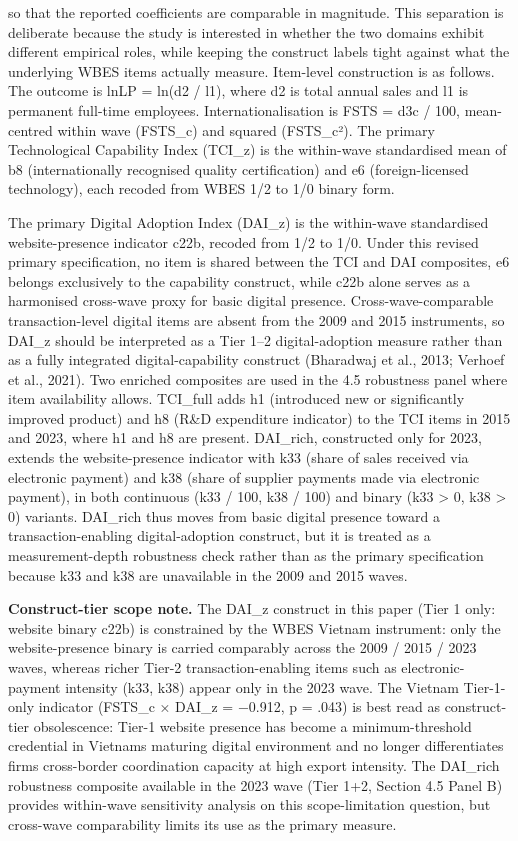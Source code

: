 \documentclass[12pt,a4paper]{article}
\begin{document}
so that the reported coefficients are comparable in magnitude. This
separation is deliberate because the study is interested in whether the
two domains exhibit different empirical roles, while keeping the
construct labels tight against what the underlying WBES items actually
measure. Item-level construction is as follows. The outcome is lnLP =
ln(d2 / l1), where d2 is total annual sales and l1 is permanent
full-time employees. Internationalisation is FSTS = d3c / 100,
mean-centred within wave (FSTS\_c) and squared (FSTS\_c²). The primary
Technological Capability Index (TCI\_z) is the within-wave standardised
mean of b8 (internationally recognised quality certification) and e6
(foreign-licensed technology), each recoded from WBES 1/2 to 1/0 binary
form.

The primary Digital Adoption Index (DAI\_z) is the within-wave
standardised website-presence indicator c22b, recoded from 1/2 to 1/0.
Under this revised primary specification, no item is shared between the
TCI and DAI composites, e6 belongs exclusively to the capability
construct, while c22b alone serves as a harmonised cross-wave proxy for
basic digital presence. Cross-wave-comparable transaction-level digital
items are absent from the 2009 and 2015 instruments, so DAI\_z should be
interpreted as a Tier 1--2 digital-adoption measure rather than as a
fully integrated digital-capability construct (Bharadwaj et al., 2013;
Verhoef et al., 2021). Two enriched composites are used in the 4.5
robustness panel where item availability allows. TCI\_full adds h1
(introduced new or significantly improved product) and h8 (R\&D
expenditure indicator) to the TCI items in 2015 and 2023, where h1 and
h8 are present. DAI\_rich, constructed only for 2023, extends the
website-presence indicator with k33 (share of sales received via
electronic payment) and k38 (share of supplier payments made via
electronic payment), in both continuous (k33 / 100, k38 / 100) and
binary (k33 \textgreater{} 0, k38 \textgreater{} 0) variants. DAI\_rich
thus moves from basic digital presence toward a transaction-enabling
digital-adoption construct, but it is treated as a measurement-depth
robustness check rather than as the primary specification because k33
and k38 are unavailable in the 2009 and 2015 waves.

\textbf{Construct-tier scope note.} The DAI\_z construct in this paper
(Tier 1 only: website binary c22b) is constrained by the WBES Vietnam
instrument: only the website-presence binary is carried comparably
across the 2009 / 2015 / 2023 waves, whereas richer Tier-2
transaction-enabling items such as electronic-payment intensity (k33,
k38) appear only in the 2023 wave. The Vietnam Tier-1-only indicator
(FSTS\_c × DAI\_z = −0.912, p = .043) is best read as construct-tier
obsolescence: Tier-1 website presence has become a minimum-threshold
credential in Vietnam\textquotesingle s maturing digital environment and
no longer differentiates firms\textquotesingle{} cross-border
coordination capacity at high export intensity. The DAI\_rich robustness
composite available in the 2023 wave (Tier 1+2, Section 4.5 Panel B)
provides within-wave sensitivity analysis on this scope-limitation
question, but cross-wave comparability limits its use as the primary
measure.
\end{document}
